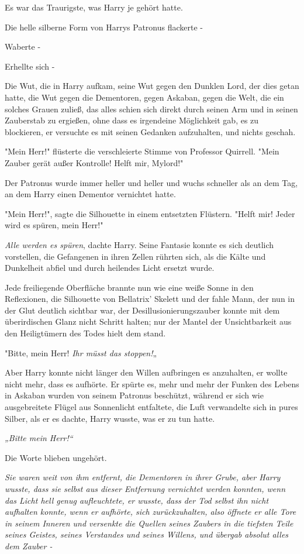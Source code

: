 {Es war das Traurigste, was Harry je gehört hatte.

Die helle silberne Form von Harrys Patronus flackerte -

Waberte -

Erhellte sich -

Die Wut, die in Harry aufkam, seine Wut gegen den Dunklen Lord, der dies getan hatte, die Wut gegen die Dementoren, gegen Askaban, gegen die Welt, die ein solches Grauen zuließ, das alles schien sich direkt durch seinen Arm und in seinen Zauberstab zu ergießen, ohne dass es irgendeine Möglichkeit gab, es zu blockieren, er versuchte es mit seinen Gedanken aufzuhalten, und nichts geschah.

"Mein Herr!" flüsterte die verschleierte Stimme von Professor Quirrell. "Mein Zauber gerät außer Kontrolle! Helft mir, Mylord!"

Der Patronus wurde immer heller und heller und wuchs schneller als an dem Tag, an dem Harry einen Dementor vernichtet hatte.

"Mein Herr!", sagte die Silhouette in einem entsetzten Flüstern. "Helft mir! Jeder wird es spüren, mein Herr!"

\emph{Alle werden es spüren}, dachte Harry. Seine Fantasie konnte es sich deutlich vorstellen, die Gefangenen in ihren Zellen rührten sich, als die Kälte und Dunkelheit abfiel und durch heilendes Licht ersetzt wurde.

Jede freiliegende Oberfläche brannte nun wie eine weiße Sonne in den Reflexionen, die Silhouette von Bellatrix' Skelett und der fahle Mann, der nun in der Glut deutlich sichtbar war, der Desillusionierungszauber konnte mit dem überirdischen Glanz nicht Schritt halten; nur der Mantel der Unsichtbarkeit aus den Heiligtümern des Todes hielt dem stand.

"Bitte, mein Herr! \emph{Ihr müsst das stoppen!}„

Aber Harry konnte nicht länger den Willen aufbringen es anzuhalten, er wollte nicht mehr, dass es aufhörte. Er spürte es, mehr und mehr der Funken des Lebens in Askaban wurden von seinem Patronus beschützt, während er sich wie ausgebreitete Flügel aus Sonnenlicht entfaltete, die Luft verwandelte sich in pures Silber, als er es dachte, Harry wusste, was er zu tun hatte.

\emph{„Bitte mein Herr!“}

Die Worte blieben ungehört.

\emph{Sie waren weit von ihm entfernt, die Dementoren in ihrer Grube, aber Harry wusste, dass sie selbst aus dieser Entfernung vernichtet werden konnten, wenn das Licht hell genug aufleuchtete, er wusste, dass der Tod selbst ihn nicht aufhalten konnte, wenn er aufhörte, sich zurückzuhalten, also öffnete er alle Tore in seinem Inneren und versenkte die Quellen seines Zaubers in die tiefsten Teile seines Geistes, seines Verstandes und seines Willens, und übergab absolut alles dem Zauber -}

}
